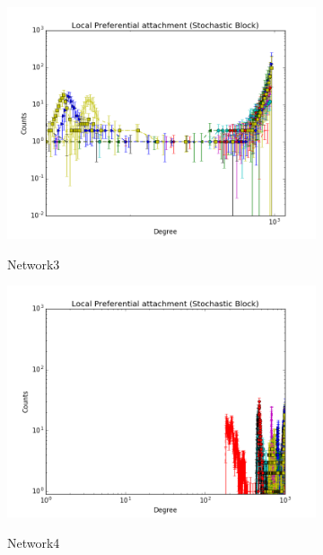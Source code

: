 \begin{figure}[h]
        \begin{subfigure}[b]{0.300\textwidth}
            \centering
            \includegraphics[width=\textwidth]{img/expe/3_ibp/figure_2}
            \label{fig:mean and std of net14}
            \caption {{\small Network3}}    
        \end{subfigure}
        \begin{subfigure}[b]{0.300\textwidth}
            \centering
            \includegraphics[width=\textwidth]{img/expe/4_ibp/figure_2}
            \label{fig:mean and std of net14}
            \caption {{\small Network4}}    
        \end{subfigure}
        \begin{subfigure}[b]{0.300\textwidth}

\end{subfigure}
\end{figure}

